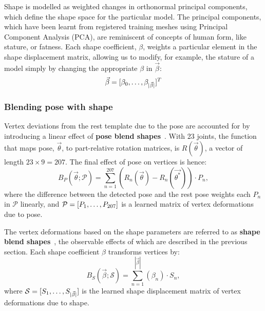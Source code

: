 \documentclass[9pt,twocolumn]{article}
\begin{document}
			\par{Shape is modelled as weighted changes in orthonormal principal components, which define the
			shape space for the particular model. The principal components, which have been learnt from registered
			training meshes using Principal Component Analysis (PCA), are reminiscent of concepts of human form,
			like stature, or fatness. Each shape coefficient, $\beta$, weights a particular element in the
			shape displacement matrix, allowing us to modify, for example, the stature of a model simply by
			changing the appropriate $\beta$ in $\vec{\beta}$:
			\begin{equation}
				\vec{\beta} = [\beta_{0}, \mathellipsis, \beta_{|\vec{\beta}|}]^{T}
			\end{equation}
			}

		\subsubsection{Blending pose with shape}

			\par{Vertex deviations from the rest template due to the pose are accounted for by introducing a
			linear effect of \textbf{pose blend shapes}~\cite{smpl}. With 23 joints, the function that maps pose, $\vec{\theta}$,
			to part-relative rotation matrices, is $R(\vec{\theta})$, a vector of length $23 \times 9 = 207$. The final
			effect of pose on vertices is hence:
			\begin{equation}
				B_{P}(\vec{\theta};\mathcal{P}) = \sum^{207}_{n=1}(R_{n}(\vec{\theta})-R_{n}(\vec{\theta^{*}}))\cdot P_{n},
			\end{equation}
			where the difference between the detected pose and the rest pose weights each $P_{n}$ in $\mathcal{P}$ linearly,
			and $\mathcal{P} = [P_{1}, \mathellipsis, P_{207}]$ is a learned matrix of vertex deformations due to pose.
			}\\

			\par{The vertex deformations based on the shape parameters are referred to as \textbf{shape blend shapes}~\cite{smpl},
			the observable effects of which are described in the previous section. Each shape coefficient $\beta$ transforms vertices
			by:
			\begin{equation}
				B_{S}(\vec{\beta};\mathcal{S}) = \sum^{|\vec{\beta}|}_{n=1}(\beta_{n})\cdot S_{n},
			\end{equation}
			where $\mathcal{S} = [S_{1}, \mathellipsis, S_{|\vec{\beta}|}]$ is the learned shape displacement matrix of
			vertex deformations due to shape.
			}\\
\end{document}
